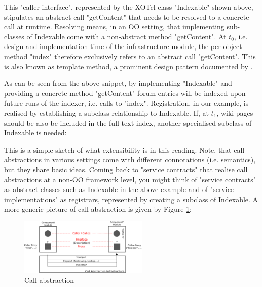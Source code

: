 %

%
This "caller interface", represented by the XOTcl class "Indexable" shown above, stipulates an abstract call "getContent" that needs to be resolved to a concrete call at runtime. Resolving means, in an OO setting, that implementing sub-classes of Indexable come with a non-abstract method "getContent". At \begin{math}t_0\end{math}, i.e. design and implementation time of the infrastructure module, the per-object method "index" therefore exclusively refers to an abstract call "getContent". This is also known as template method, a prominent design pattern documented by \cite{gof:1994}.
%

%
As can be seen from the above snippet, by implementing "Indexable" and providing a concrete method "getContent" forum entries will be indexed upon future runs of the indexer, i.e. calls to "index". Registration, in our example, is realised by establishing a subclass relationship to Indexable. If, at \begin{math}t_1\end{math}, wiki pages should be also be included in the full-text index, another specialised subclass of Indexable is needed:
%

%
This is a simple sketch of what extensibility is in this reading. Note, that call abstractions in various settings come with different connotations (i.e. semantics), but they share basic ideas. Coming back to "service contracts" that realise call abstractions at a non-OO framework level, you might think of "service contracts" as abstract classes such as Indexable in the above example and of "service implementations" as registrars, represented by creating a subclass of Indexable. A more generic picture of call abstraction is given by Figure \ref{fig:advanced:ca:1}: 
  \begin{figure}[htbp]
\begin{center}
\includegraphics[width=0.55\textwidth]{img/call-abstraction-scheme.png}
\caption{Call abstraction}
\label{fig:advanced:ca:1}
\end{center}
\end{figure}

